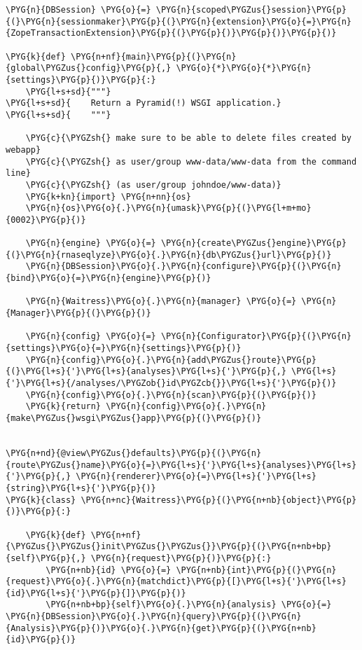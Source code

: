 \begin{Verbatim}[commandchars=\\\{\}]
\PYG{n}{DBSession} \PYG{o}{=} \PYG{n}{scoped\PYGZus{}session}\PYG{p}{(}\PYG{n}{sessionmaker}\PYG{p}{(}\PYG{n}{extension}\PYG{o}{=}\PYG{n}{ZopeTransactionExtension}\PYG{p}{(}\PYG{p}{)}\PYG{p}{)}\PYG{p}{)}

\PYG{k}{def} \PYG{n+nf}{main}\PYG{p}{(}\PYG{n}{global\PYGZus{}config}\PYG{p}{,} \PYG{o}{*}\PYG{o}{*}\PYG{n}{settings}\PYG{p}{)}\PYG{p}{:}
    \PYG{l+s+sd}{"""}
\PYG{l+s+sd}{    Return a Pyramid(!) WSGI application.}
\PYG{l+s+sd}{    """}

    \PYG{c}{\PYGZsh{} make sure to be able to delete files created by webapp}
    \PYG{c}{\PYGZsh{} as user/group www-data/www-data from the command line}
    \PYG{c}{\PYGZsh{} (as user/group johndoe/www-data)}
    \PYG{k+kn}{import} \PYG{n+nn}{os}
    \PYG{n}{os}\PYG{o}{.}\PYG{n}{umask}\PYG{p}{(}\PYG{l+m+mo}{0002}\PYG{p}{)}

    \PYG{n}{engine} \PYG{o}{=} \PYG{n}{create\PYGZus{}engine}\PYG{p}{(}\PYG{n}{rnaseqlyze}\PYG{o}{.}\PYG{n}{db\PYGZus{}url}\PYG{p}{)}
    \PYG{n}{DBSession}\PYG{o}{.}\PYG{n}{configure}\PYG{p}{(}\PYG{n}{bind}\PYG{o}{=}\PYG{n}{engine}\PYG{p}{)}

    \PYG{n}{Waitress}\PYG{o}{.}\PYG{n}{manager} \PYG{o}{=} \PYG{n}{Manager}\PYG{p}{(}\PYG{p}{)}

    \PYG{n}{config} \PYG{o}{=} \PYG{n}{Configurator}\PYG{p}{(}\PYG{n}{settings}\PYG{o}{=}\PYG{n}{settings}\PYG{p}{)}
    \PYG{n}{config}\PYG{o}{.}\PYG{n}{add\PYGZus{}route}\PYG{p}{(}\PYG{l+s}{'}\PYG{l+s}{analyses}\PYG{l+s}{'}\PYG{p}{,} \PYG{l+s}{'}\PYG{l+s}{/analyses/\PYGZob{}id\PYGZcb{}}\PYG{l+s}{'}\PYG{p}{)}
    \PYG{n}{config}\PYG{o}{.}\PYG{n}{scan}\PYG{p}{(}\PYG{p}{)}
    \PYG{k}{return} \PYG{n}{config}\PYG{o}{.}\PYG{n}{make\PYGZus{}wsgi\PYGZus{}app}\PYG{p}{(}\PYG{p}{)}


\PYG{n+nd}{@view\PYGZus{}defaults}\PYG{p}{(}\PYG{n}{route\PYGZus{}name}\PYG{o}{=}\PYG{l+s}{'}\PYG{l+s}{analyses}\PYG{l+s}{'}\PYG{p}{,} \PYG{n}{renderer}\PYG{o}{=}\PYG{l+s}{'}\PYG{l+s}{string}\PYG{l+s}{'}\PYG{p}{)}
\PYG{k}{class} \PYG{n+nc}{Waitress}\PYG{p}{(}\PYG{n+nb}{object}\PYG{p}{)}\PYG{p}{:}

    \PYG{k}{def} \PYG{n+nf}{\PYGZus{}\PYGZus{}init\PYGZus{}\PYGZus{}}\PYG{p}{(}\PYG{n+nb+bp}{self}\PYG{p}{,} \PYG{n}{request}\PYG{p}{)}\PYG{p}{:}
        \PYG{n+nb}{id} \PYG{o}{=} \PYG{n+nb}{int}\PYG{p}{(}\PYG{n}{request}\PYG{o}{.}\PYG{n}{matchdict}\PYG{p}{[}\PYG{l+s}{'}\PYG{l+s}{id}\PYG{l+s}{'}\PYG{p}{]}\PYG{p}{)}
        \PYG{n+nb+bp}{self}\PYG{o}{.}\PYG{n}{analysis} \PYG{o}{=} \PYG{n}{DBSession}\PYG{o}{.}\PYG{n}{query}\PYG{p}{(}\PYG{n}{Analysis}\PYG{p}{)}\PYG{o}{.}\PYG{n}{get}\PYG{p}{(}\PYG{n+nb}{id}\PYG{p}{)}


\end{Verbatim}
